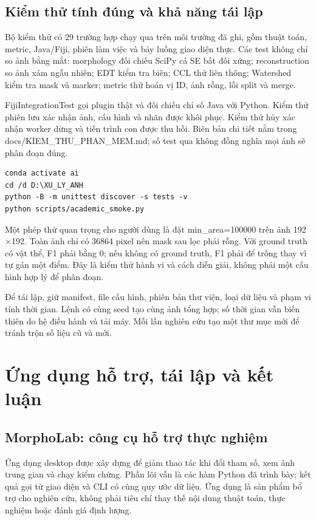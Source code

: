 \documentclass[12pt,a4paper,oneside]{report}
\begin{document}
\section{Kiểm thử tính đúng và khả năng tái lập}
Bộ kiểm thử có 29 trường hợp chạy qua trên môi trường đã ghi, gồm thuật toán, metric, Java/Fiji, phiên làm việc và bảy luồng giao diện thực. Các test không chỉ so ảnh bằng mắt: morphology đối chiếu SciPy cả SE bất đối xứng; reconstruction so ảnh xám ngẫu nhiên; EDT kiểm tra biên; CCL thử liên thông; Watershed kiểm tra mask và marker; metric thử hoán vị ID, ảnh rỗng, lỗi split và merge.

FijiIntegrationTest gọi plugin thật và đối chiếu chỉ số Java với Python. Kiểm thử phiên lưu xác nhận ảnh, cấu hình và nhãn được khôi phục. Kiểm thử hủy xác nhận worker dừng và tiến trình con được thu hồi. Biên bản chi tiết nằm trong docs/KIEM\_THU\_PHAN\_MEM.md; số test qua không đồng nghĩa mọi ảnh sẽ phân đoạn đúng.



\par\medskip\noindent\begin{minipage}[t]{\linewidth}
\begin{lstlisting}[language={},numbers=none]
conda activate ai
cd /d D:\XU_LY_ANH
python -B -m unittest discover -s tests -v
python scripts/academic_smoke.py
\end{lstlisting}\end{minipage}\par\medskip



Một phép thử quan trọng cho người dùng là đặt min\_area=100000 trên ảnh 192\ensuremath{\times}192. Toàn ảnh chỉ có 36864 pixel nên mask sau lọc phải rỗng. Với ground truth có vật thể, F1 phải bằng 0; nếu không có ground truth, F1 phải để trống thay vì tự gán một điểm. Đây là kiểm thử hành vi và cách diễn giải, không phải một cấu hình hợp lý để phân đoạn.

Để tái lập, giữ manifest, file cấu hình, phiên bản thư viện, loại dữ liệu và phạm vi tính thời gian. Lệnh có cùng seed tạo cùng ảnh tổng hợp; số thời gian vẫn biến thiên do hệ điều hành và tải máy. Mỗi lần nghiên cứu tạo một thư mục mới để tránh trộn số liệu cũ và mới.
\chapter{Ứng dụng hỗ trợ, tái lập và kết luận}\label{chap:app}
\section{MorphoLab: công cụ hỗ trợ thực nghiệm}
Ứng dụng desktop được xây dựng để giảm thao tác khi đổi tham số, xem ảnh trung gian và chạy kiểm chứng. Phần lõi vẫn là các hàm Python đã trình bày; kết quả gọi từ giao diện và CLI có cùng quy ước dữ liệu. Ứng dụng là sản phẩm bổ trợ cho nghiên cứu, không phải tiêu chí thay thế nội dung thuật toán, thực nghiệm hoặc đánh giá định lượng.
\end{document}
